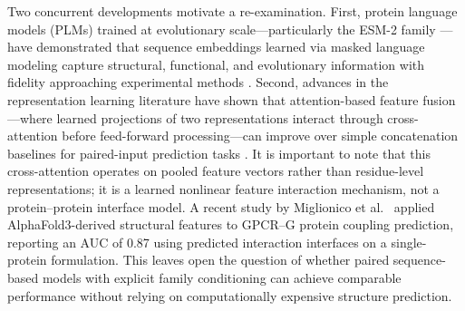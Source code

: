 \documentclass[11pt,a4paper]{article}
\begin{document}
Two concurrent developments motivate a re-examination. First, protein language models (PLMs) trained at evolutionary scale---particularly the ESM-2 family \cite{lin2023evolutionary}---have demonstrated that sequence embeddings learned via masked language modeling capture structural, functional, and evolutionary information with fidelity approaching experimental methods \cite{rives2021biological, elnaggar2021prottrans}. Second, advances in the representation learning literature have shown that attention-based feature fusion---where learned projections of two representations interact through cross-attention before feed-forward processing---can improve over simple concatenation baselines for paired-input prediction tasks \cite{vaswani2017attention, hashemifar2018predicting, sledzieski2021dscript, chen2019transform}. It is important to note that this cross-attention operates on pooled feature vectors rather than residue-level representations; it is a learned nonlinear feature interaction mechanism, not a protein--protein interface model. A recent study by Miglionico et al.\ \cite{miglionico2025predicting} applied AlphaFold3-derived structural features to GPCR--G protein coupling prediction, reporting an AUC of 0.87 using predicted interaction interfaces on a single-protein formulation. This leaves open the question of whether paired sequence-based models with explicit family conditioning can achieve comparable performance without relying on computationally expensive structure prediction.
\end{document}
